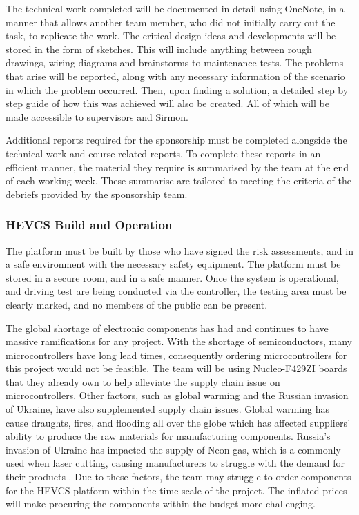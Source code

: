 \documentclass [12pt]{article}
\begin{document}
The technical work completed will be documented in detail using OneNote, in a manner that allows another team member, who did not initially carry out the task, to replicate the work. The critical design ideas and developments will be stored in the form of sketches. This will include anything between rough drawings, wiring diagrams and brainstorms to maintenance tests. The problems that arise will be reported, along with any necessary information of the scenario in which the problem occurred. Then, upon finding a solution, a detailed step by step guide of how this was achieved will also be created. All of which will be made accessible to supervisors and Sirmon.

Additional reports required for the sponsorship must be completed alongside the technical work and course related reports. To complete these reports in an efficient manner, the material they require is summarised by the team at the end of each working week. These summarise are tailored to meeting the criteria of the debriefs provided by the sponsorship team.

\subsubsection{HEVCS Build and Operation}

The platform must be built by those who have signed the risk assessments, and in a safe environment with the necessary safety equipment. The platform must be stored in a secure room, and in a safe manner. Once the system is operational, and driving test are being conducted via the controller, the testing area must be clearly marked, and no members of the public can be present.

The global shortage of electronic components has had and continues to have massive ramifications for any project. With the shortage of semiconductors, many microcontrollers have long lead times, consequently ordering microcontrollers for this project would not be feasible. The team will be using Nucleo-F429ZI boards that they already own to help alleviate the supply chain issue on microcontrollers. Other factors, such as global warming and the Russian invasion of Ukraine, have also supplemented supply chain issues. Global warming has cause draughts, fires, and flooding all over the globe which has affected suppliers' ability to produce the raw materials for manufacturing components. Russia's invasion of Ukraine has impacted the supply of Neon gas, which is a commonly used when laser cutting, causing manufacturers to struggle with the demand for their products \cite{Supply_Chain}. Due to these factors, the team may struggle to order components for the HEVCS platform within the time scale of the project. The inflated prices will make procuring the components within the budget more challenging.
\end{document}
